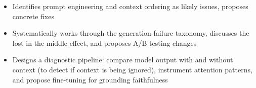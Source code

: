 \begin{interviewq}

\goodgreat
\begin{itemize}
    \item {} Identifies prompt engineering and context ordering as likely
          issues, proposes concrete fixes
    \item {} Systematically works through the generation failure taxonomy,
          discusses the lost-in-the-middle effect, and proposes A/B testing changes
    \item {} Designs a diagnostic pipeline: compare model output with
          and without context (to detect if context is being ignored), instrument
          attention patterns, and propose fine-tuning for grounding faithfulness
\end{itemize}

\end{interviewq}

\bigskip

